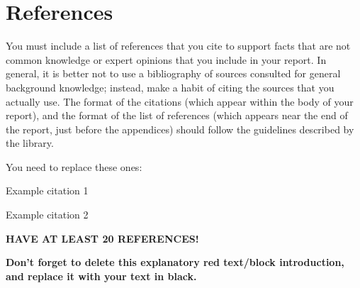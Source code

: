 \chapter{References} %

\begin{tcolorbox}[      %
    boxrule=0pt,        %
    colback=white,      %
    coltext=red         %
]                       %
    You must include a list of references that you cite to support facts that are not common knowledge or expert opinions that you include in your report. In general, it is better not to use a bibliography of sources consulted for general background knowledge; instead, make a habit of citing the sources that you actually use. The format of the citations (which appear within the body of your report), and the format of the list of references (which appears near the end of the report, just before the appendices) should follow the guidelines described by the library.
    \vspace{15pt}

    You need to replace these ones:
    \vspace{15pt}
    
    Example citation 1 \cite{1672377}
    \vspace{15pt}
    
    Example citation 2 \cite{8282257}
    \vspace{15pt}

    \textbf{HAVE AT LEAST 20 REFERENCES!}
    
    \vspace{15pt}       %
    \begin{center}      %
    \textbf{Don't forget to delete this explanatory red text/block introduction, and replace it with your text in black.}
    \end{center}        %
\end{tcolorbox}         %


\printbibliography[heading=none]
